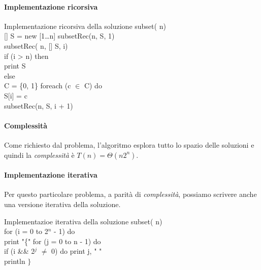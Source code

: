 \paragraph{Implementazione ricorsiva}
\begin{minicode}{Implementazione ricorsiva della soluzione}
\ind subset( n)\\
    [] S = new [1\dots n]\hfill{}
    subsetRec(n, S, 1)\\

\ind subsetRec( n, [] S,  i)\\
    \indf if (i > n) then\\
        print S\\
    \indf else\\
         C = \{0, 1\}\hfill{}
        \indff foreach (c $\in$ C) do\\
            S[i] = c\\
            subsetRec(n, S, i + 1)
\end{minicode}

\paragraph{Complessità}
Come richiesto dal problema, l'algoritmo esplora tutto lo spazio delle soluzioni
e quindi la \emph{complessità} è $T(n)=\Theta(n2^n)$.

\paragraph{Implementazione iterativa}
Per questo particolare problema, a parità di \emph{complessità}, possiamo
scrivere anche una versione iterativa della soluzione.
\begin{minicode}{Implementazioe iterativa della soluzione}
\ind subset( n)\\
    \indf for (i = 0 to 2$^n$ - 1) do\\
        print "\{"\hfill{}
        \indff for (j = 0 to n - 1) do\\
            \indfff if (i \&\& 2$^j$ $\neq$ 0) do\hfill{}
                print j, " "\\
        \indff println $\}$
\end{minicode}


